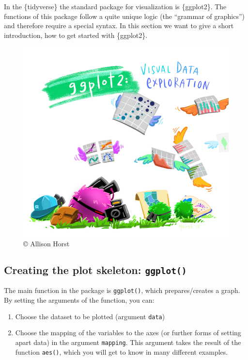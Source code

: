 \documentclass[]{book}
\providecommand{\tightlist}{%
  \setlength{\itemsep}{0pt}\setlength{\parskip}{0pt}}
\begin{document}
In the \{tidyverse\} the standard package for visualization is \{ggplot2\}.
The functions of this package follow a quite unique logic (the ``grammar of graphics'') and therefore require a special syntax.
In this section we want to give a short introduction, how to get started with \{ggplot2\}.

\begin{figure}

\hfill{}\includegraphics[width=11.11in]{img/ggplot2_exploratory} 

\caption{© Allison Horst}\label{fig:unnamed-chunk-30}
\end{figure}

\hypertarget{creating-the-plot-skeleton-ggplot}{%
\subsection{\texorpdfstring{Creating the plot skeleton: \texttt{ggplot()}}{Creating the plot skeleton: ggplot()}}\label{creating-the-plot-skeleton-ggplot}}

The main function in the package is \texttt{ggplot()}, which prepares/creates a graph.
By setting the arguments of the function, you can:

\begin{enumerate}
\def\labelenumi{\arabic{enumi}.}
\tightlist
\item
  Choose the dataset to be plotted (argument \texttt{data})
\item
  Choose the mapping of the variables to the axes (or further forms of setting apart data) in the argument \texttt{mapping}.
  This argument takes the result of the function \texttt{aes()}, which you will get to know in many different examples.
\end{enumerate}
\end{document}
